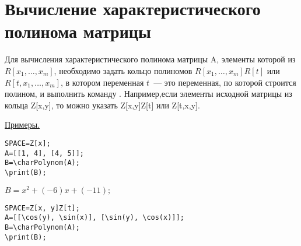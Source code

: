 
\section{Вычисление характеристического полинома матрицы}

Для вычисления характеристического полинома матрицы A, элементы которой из $R[x_1,\ldots,x_m]$, необходимо
задать кольцо полиномов $R[x_1,\ldots,x_m]R[t]$ или $R[t,x_1,\ldots,x_m]$, в котором переменная $t$~--- это
переменная, по которой строится полином, 
и выполнить команду .
Например,если элементы исходной матрицы из кольца Z[x,y],
то  можно указать Z[x,y]Z[t] или Z[t,x,y].

\underline{Примеры. }

\vspace*{-2mm}
\begin{verbatim}
SPACE=Z[x]; 
A=[[1, 4], [4, 5]];
B=\charPolynom(A); 
\print(B);
\end{verbatim}
{
$B = x^{2}+(-6)x+(-11);$} 

\begin{verbatim}
SPACE=Z[x, y]Z[t]; 
A=[[\cos(y), \sin(x)], [\sin(y), \cos(x)]];
B=\charPolynom(A); 
\print(B);
\end{verbatim}

